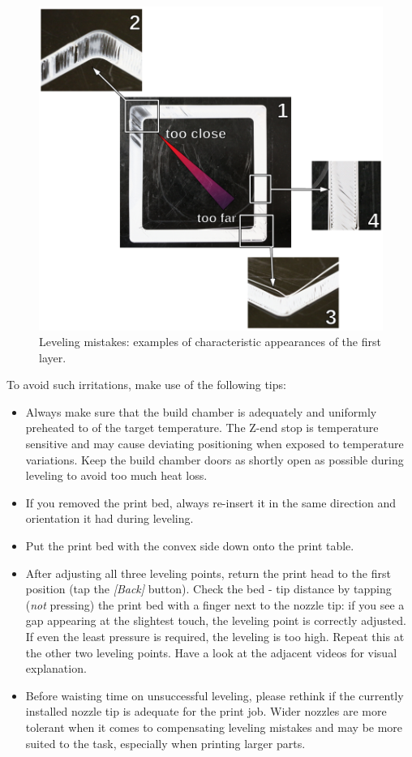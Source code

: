 \begin{figure}[H]
  \centering
  \includegraphics[width=.7\linewidth]{./img/lopsidedleveling.png}
  \caption{Leveling mistakes: examples of characteristic appearances of the first layer.}
\end{figure}

To avoid such irritations, make use of the following tips: 

\begin{itemize}
  \item Always make sure that the build chamber is adequately and uniformly preheated to of the target
        temperature.
        The Z-end stop is temperature sensitive and may cause deviating positioning when exposed to temperature variations.
        Keep the build chamber doors as shortly open as possible during leveling to avoid too much heat loss.
  \item If you removed the print bed, always re-insert it in the same direction and 
        orientation it had during leveling.
  \item Put the print bed with the convex side down onto the print table.
  \item After adjusting all three leveling points, return the print head to the first 
        position (tap the \emph{[Back]} button). Check the bed - tip distance by tapping 
        (\emph{not} pressing) the print bed with a finger next to the nozzle tip: if you see a gap appearing at the slightest touch, the leveling point is correctly adjusted. If even the least pressure is required, the leveling is too high. Repeat this at the other two leveling points. Have a look at the adjacent videos for visual explanation.
  \item Before waisting time on unsuccessful leveling, please rethink if the currently 
        installed nozzle tip is adequate for the print job. Wider nozzles are more tolerant when it comes to compensating leveling mistakes and may be more suited to the task, especially when printing larger parts.
\end{itemize}



